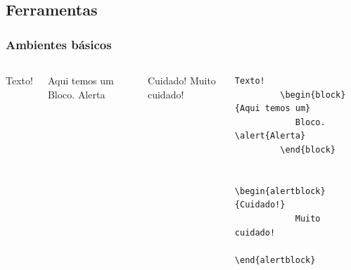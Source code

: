 \documentclass{beamer}
\begin{document}
\subsection{Ferramentas}

\begin{frame}[fragile]
   \frametitle{Ambientes básicos}
   \begin{columns}
      \column{4cm}
      Texto!
      \begin{block}{Aqui temos um}
         Bloco. \alert{Alerta}
      \end{block}

      \begin{alertblock}{Cuidado!}
         Muito cuidado!
      \end{alertblock}
      \column{6cm}
      \begin{lstlisting}[frame=single,gobble=9]
         Texto!
         \begin{block}{Aqui temos um}
            Bloco. \alert{Alerta}
         \end{block}
         
         \begin{alertblock}{Cuidado!}
            Muito cuidado!
         \end{alertblock}
      \end{lstlisting}
   \end{columns}
\end{frame}
\end{document}
